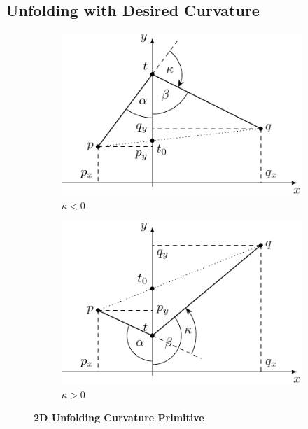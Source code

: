 \documentclass{stdlocal}
\begin{document}
\subsection{Unfolding with Desired Curvature} %
\label{sub:unfolding_with_desired_curvature}

  \begin{figure}[h]
    \centering
    \begin{subfigure}[b]{0.49\linewidth}
      \centering
      \includegraphics[width=\linewidth]{figures/unfolding_curvature_2d.pdf}
      \caption{$κ < 0$}
    \end{subfigure}
    \hfill
    \begin{subfigure}[b]{0.49\linewidth}
      \centering
      \includegraphics[width=\linewidth]{figures/unfolding_curvature_2d_positive.pdf}
      \caption{$κ > 0$}
    \end{subfigure}
    \caption[2D Unfolding Curvature Primitive]{%
      \textbf{2D Unfolding Curvature Primitive}\\
    }
    \label{fig:}
  \end{figure}
\end{document}
